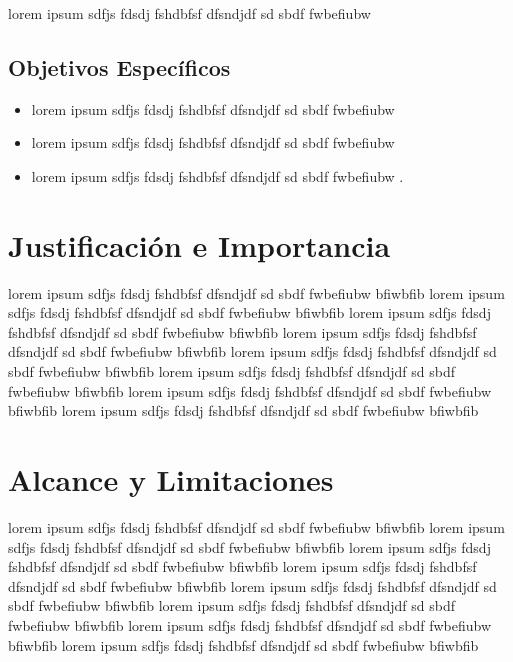 	lorem ipsum sdfjs fdsdj fshdbfsf dfsndjdf sd sbdf fwbefiubw 

\subsection{Objetivos Espec\'ificos}
 
\begin{itemize}
\item lorem ipsum sdfjs fdsdj fshdbfsf dfsndjdf sd sbdf fwbefiubw 
\item lorem ipsum sdfjs fdsdj fshdbfsf dfsndjdf sd sbdf fwbefiubw 
\item lorem ipsum sdfjs fdsdj fshdbfsf dfsndjdf sd sbdf fwbefiubw .

\end{itemize}

\section{Justificaci\'on e Importancia}

	lorem ipsum sdfjs fdsdj fshdbfsf dfsndjdf sd sbdf fwbefiubw bfiwbfib lorem ipsum sdfjs fdsdj fshdbfsf dfsndjdf sd sbdf fwbefiubw bfiwbfib lorem ipsum sdfjs fdsdj fshdbfsf dfsndjdf sd sbdf fwbefiubw bfiwbfib lorem ipsum sdfjs fdsdj fshdbfsf dfsndjdf sd sbdf fwbefiubw bfiwbfib lorem ipsum sdfjs fdsdj fshdbfsf dfsndjdf sd sbdf fwbefiubw bfiwbfib lorem ipsum sdfjs fdsdj fshdbfsf dfsndjdf sd sbdf fwbefiubw bfiwbfib lorem ipsum sdfjs fdsdj fshdbfsf dfsndjdf sd sbdf fwbefiubw bfiwbfib lorem ipsum sdfjs fdsdj fshdbfsf dfsndjdf sd sbdf fwbefiubw bfiwbfib
	
\section{Alcance y Limitaciones}

	lorem ipsum sdfjs fdsdj fshdbfsf dfsndjdf sd sbdf fwbefiubw bfiwbfib lorem ipsum sdfjs fdsdj fshdbfsf dfsndjdf sd sbdf fwbefiubw bfiwbfib lorem ipsum sdfjs fdsdj fshdbfsf dfsndjdf sd sbdf fwbefiubw bfiwbfib lorem ipsum sdfjs fdsdj fshdbfsf dfsndjdf sd sbdf fwbefiubw bfiwbfib lorem ipsum sdfjs fdsdj fshdbfsf dfsndjdf sd sbdf fwbefiubw bfiwbfib lorem ipsum sdfjs fdsdj fshdbfsf dfsndjdf sd sbdf fwbefiubw bfiwbfib lorem ipsum sdfjs fdsdj fshdbfsf dfsndjdf sd sbdf fwbefiubw bfiwbfib lorem ipsum sdfjs fdsdj fshdbfsf dfsndjdf sd sbdf fwbefiubw bfiwbfib